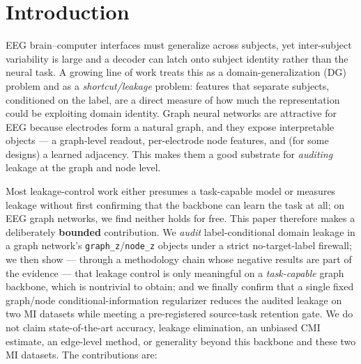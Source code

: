 \section{Introduction}

EEG brain--computer interfaces must generalize across subjects, yet inter-subject variability is large and
a decoder can latch onto subject identity rather than the neural task. A growing line of work treats this
as a domain-generalization (DG) problem and as a \emph{shortcut/leakage} problem: features that separate
subjects, conditioned on the label, are a direct measure of how much the representation could be exploiting
domain identity. Graph neural networks are attractive for EEG because electrodes form a natural graph, and
they expose interpretable objects --- a graph-level readout, per-electrode node features, and (for some
designs) a learned adjacency. This makes them a good substrate for \emph{auditing} leakage at the graph and
node level.

Most leakage-control work either presumes a task-capable model or measures leakage without first confirming
that the backbone can learn the task at all; on EEG graph networks, we find neither holds for free. This
paper therefore makes a deliberately \textbf{bounded} contribution. We \emph{audit} label-conditional
domain leakage in a graph network's \texttt{graph\_z}/\texttt{node\_z} objects under a strict
no-target-label firewall; we then show --- through a methodology chain whose negative results are part of
the evidence --- that leakage control is only meaningful on a \emph{task-capable} graph backbone, which is
nontrivial to obtain; and we finally confirm that a single fixed graph/node conditional-information
regularizer reduces the audited leakage on two MI datasets while meeting a pre-registered source-task
retention gate. We do not claim state-of-the-art accuracy, leakage elimination, an unbiased CMI estimate,
an edge-level method, or generality beyond this backbone and these two MI datasets. The contributions are:

